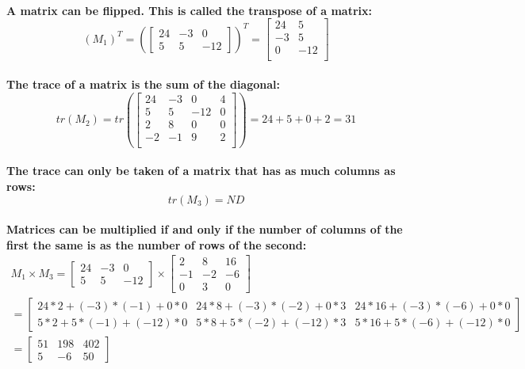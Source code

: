 \documentclass[11pt]{report}
\begin{document}
    \paragraph{
    A matrix can be flipped. This is called the transpose of a matrix: \[(M_1)^T = (\begin{bmatrix}
        24 & -3 & 0\\
        5 & 5 & -12
    \end{bmatrix})^T = \begin{bmatrix}
        24 & 5\\
        -3 & 5\\
        0 & -12\\
    \end{bmatrix}\]
    }

     \paragraph{
    The trace of a matrix is the sum of the diagonal: \[tr(M_2) = tr(\begin{bmatrix}
        24 & -3 & 0 & 4\\
        5 & 5 & -12 & 0\\
        2 & 8 & 0 & 0 \\
        -2 & -1 & 9 & 2\\
    \end{bmatrix}) = 24 + 5 + 0 + 2 = 31\]
    }

    \paragraph{
    The trace can only be taken of a matrix that has as much columns as rows: \[tr(M_3) = ND\]
    }

    \paragraph{
    Matrices can be multiplied if and only if the number of columns of the first the same is as the number of rows of the second: \begin{multline}M_1 \times M_3 = \begin{bmatrix}
        24 & -3 & 0\\
        5 & 5 & -12
    \end{bmatrix} \times \begin{bmatrix}
        2 & 8 & 16\\
        -1 & -2 & -6\\
        0 & 3 & 0
    \end{bmatrix} \\ = \begin{bmatrix}
        24 * 2 + (-3)*(-1) + 0*0 & 24 * 8 + (-3) * (-2) + 0 *3 & 24 * 16 + (-3)*(-6)+0*0\\
        5 * 2 + 5 * (-1) + (-12) * 0 & 5 * 8 + 5 * (-2) + (-12) * 3 & 5 * 16 + 5 * (-6) + (-12) * 0 
    \end{bmatrix} \\ = \begin{bmatrix}
        51 & 198 & 402\\
        5 & -6 & 50
    \end{bmatrix} \end{multline}
    }
\end{document}
